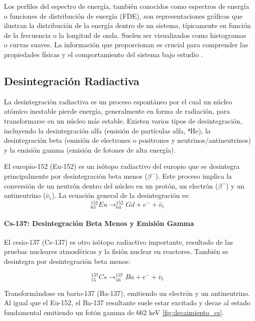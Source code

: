 \documentclass[twocolumn,a4paper,11pt]{scrartcl}
\begin{document}
Los perfiles del espectro de energía, también conocidos como espectros de energía o funciones de distribución de energía (FDE), son representaciones gráficas que ilustran la distribución de la energía dentro de un sistema, típicamente en función de la frecuencia o la longitud de onda.  Suelen ser visualizados como histogramas o curvas suaves.  La información que proporcionan es crucial para comprender las propiedades físicas y el comportamiento del sistema bajo estudio \cite{Martin2010}.


\subsection*{Desintegración Radiactiva}

La desintegración radiactiva es un proceso espontáneo por el cual un núcleo atómico inestable pierde energía, generalmente en forma de radiación, para transformarse en un núcleo más estable.  Existen varios tipos de desintegración, incluyendo la desintegración alfa (emisión de partículas alfa, ⁴He), la desintegración beta (emisión de electrones o positrones y neutrinos/antineutrinos) y la emisión gamma (emisión de fotones de alta energía).

El europio-152 (Eu-152) es un isótopo radiactivo del europio que se desintegra principalmente por desintegración beta menos ($\beta^-$). Este proceso implica la conversión de un neutrón dentro del núcleo en un protón, un electrón ($\beta^-$) y un antineutrino ($\bar \nu _e$). La ecuación general de la desintegración es:
\begin{equation}
^{152}_{63}Eu \rightarrow ^{152}_{64}Gd + e^- + \bar{\nu}_e
\end{equation}

\paragraph{Cs-137: Desintegración Beta Menos y Emisión Gamma}

El cesio-137 (Cs-137) es otro isótopo radiactivo importante, resultado de las pruebas nucleares atmosféricas y la fisión nuclear en reactores. También se desintegra por desintegración beta menos:

\begin{equation}
^{137}_{55}Cs \rightarrow ^{137}_{56}Ba + e^- + \bar{\nu}_e
\end{equation}

Transformándose en bario-137 (Ba-137), emitiendo un electrón y un antineutrino.  Al igual que el Eu-152, el Ba-137 resultante suele estar excitado y decae al estado fundamental emitiendo un fotón gamma de 662 keV \ref{fig:decaimiento_cs}.
\end{document}
